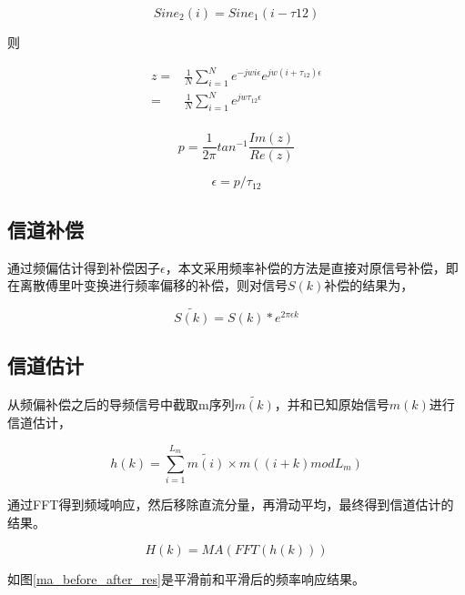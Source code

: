 \documentclass[master]{seuthesis} %
\begin{document}
\begin{Main}
\begin{equation}
    Sine_2(i) = Sine_1(i - \tau{12})
\end{equation}

则

\begin{align}
    z = & \frac{1}{N} \sum_{i=1}^N e^{-jwi\epsilon} e^{jw(i+\tau_{12})\epsilon} \\
      = & \frac{1}{N} \sum_{i=1}^N e^{jw\tau_{12}\epsilon} \\
\end{align}

\begin{equation}
    p = \frac{1}{2\pi} tan^{-1} \frac{Im(z)}{Re(z)} 
\end{equation}

\begin{equation}
    \epsilon = p / \tau_{12}
\end{equation}


\subsection{信道补偿}

通过频偏估计得到补偿因子$\epsilon$，本文采用频率补偿的方法是直接对原信号补偿，即在离散傅里叶变换进行频率偏移的补偿，则对信号$S(k)$补偿的结果为，

\begin{equation}
    \tilde{S(k)} = S(k) * e^{2\pi \epsilon k}
\end{equation}

\subsection{信道估计}

从频偏补偿之后的导频信号中截取m序列$\tilde{m(k)}$，并和已知原始信号$m(k)$进行信道估计，

\begin{equation}
    h(k) = \sum_{i=1}^{L_m} \tilde{m(i)} \times m( (i + k) mod L_m )
\end{equation}

通过FFT得到频域响应，然后移除直流分量，再滑动平均，最终得到信道估计的结果。

\begin{equation}
    H(k) = MA(FFT(h(k)))
\end{equation}

如图\ref{ma_before_after_res}是平滑前和平滑后的频率响应结果。


\end{Main}
\end{document}
